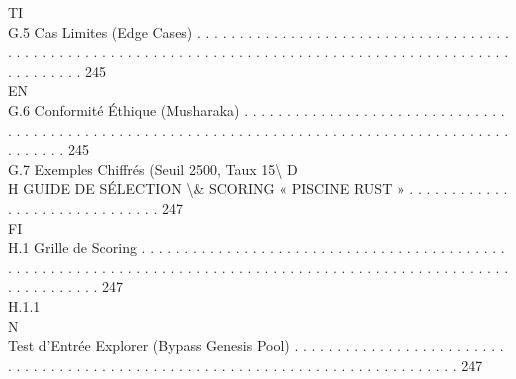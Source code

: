 \documentclass[12pt,landscape,a4paper]{article}
\begin{document}
\vspace{0.5em}
\vspace{0.5em}
\vspace{0.5em}
\vspace{0.5em}
TI\\
G.5     Cas Limites (Edge Cases) . . . . . . . . . . . . . . . . . . . . . . . . . . . . . . . . . . . . . . . . . . . . . . . . . . . . . . . . . . . . . . . . . . . . . . . . . . . . . . . . . . . . . . . . . . . . . . . . . . . . . . . . . 245\\
\vspace{0.5em}
\vspace{0.5em}
\vspace{0.5em}
\vspace{0.5em}
EN\\
G.6     Conformité Éthique (Musharaka) . . . . . . . . . . . . . . . . . . . . . . . . . . . . . . . . . . . . . . . . . . . . . . . . . . . . . . . . . . . . . . . . . . . . . . . . . . . . . . . . . . . . . . . . . . . . . . . . . 245\\
G.7     Exemples Chiffrés (Seuil 2500, Taux 15\textbackslash{}%
\vspace{0.5em}
\vspace{0.5em}
\vspace{0.5em}
\vspace{0.5em}
D\\
H     GUIDE DE SÉLECTION \textbackslash{}& SCORING « PISCINE RUST » . . . . . . . . . . . . . . . . . . . . . . . . . . . . . . 247\\
\vspace{0.5em}
\vspace{0.5em}
\vspace{0.5em}
FI\\
H.1     Grille de Scoring . . . . . . . . . . . . . . . . . . . . . . . . . . . . . . . . . . . . . . . . . . . . . . . . . . . . . . . . . . . . . . . . . . . . . . . . . . . . . . . . . . . . . . . . . . . . . . . . . . . . . . . . . . . . . . . . . 247\\
H.1.1\\
N\\
Test d’Entrée Explorer (Bypass Genesis Pool) . . . . . . . . . . . . . . . . . . . . . . . . . . . . . . . . . . . . . . . . . . . . . . . . . . . . . . . . . . . . . . . . . . . . . . . . . . . . . . 247\\
\end{document}
